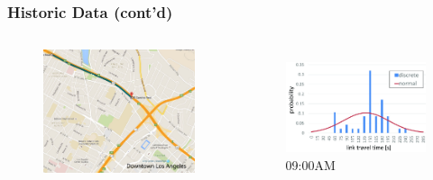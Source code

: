 \documentclass[t]{beamer}
\begin{document}
\begin{frame}\frametitle{Historic Data \small{(cont'd)}}
\vspace{-0.45in}
\begin{columns}
	\begin{figure}
		\centering
		\includegraphics[scale=0.15]{segment.jpg}
	\end{figure}
	\begin{figure}
		\centering
		\includegraphics[scale=0.2]{ltt_0900.jpg}
		\vspace{-0.05in}
		\\ 09:00AM
	\end{figure}
\end{columns}
\vspace{-0.1in}

\end{frame}
\end{document}
